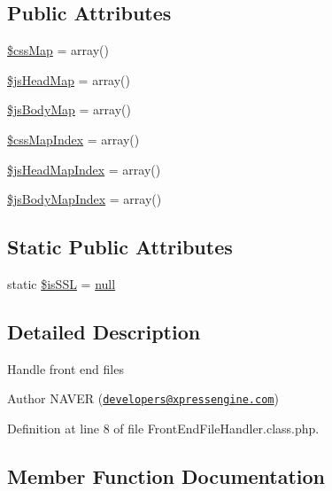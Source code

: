 \subsection*{Public Attributes}
\begin{DoxyCompactItemize}
\item 
\hyperlink{classFrontEndFileHandler_ae7470e6b48cdd0b76b8bd0fd8e38850c}{\$css\+Map} = array()
\item 
\hyperlink{classFrontEndFileHandler_ab434f9c8c874aaf8186e259dff95d116}{\$js\+Head\+Map} = array()
\item 
\hyperlink{classFrontEndFileHandler_ad03de614a088bc386c393543a3cd9aed}{\$js\+Body\+Map} = array()
\item 
\hyperlink{classFrontEndFileHandler_a61df1d725cd1884fd0a260dec738a4b7}{\$css\+Map\+Index} = array()
\item 
\hyperlink{classFrontEndFileHandler_a151a55b31ffaec411a86b7f618eed4ac}{\$js\+Head\+Map\+Index} = array()
\item 
\hyperlink{classFrontEndFileHandler_aba61415d3f993f1f6b9cddc0024f50b1}{\$js\+Body\+Map\+Index} = array()
\end{DoxyCompactItemize}
\subsection*{Static Public Attributes}
\begin{DoxyCompactItemize}
\item 
static \hyperlink{classFrontEndFileHandler_a1e709934ab4023d10850268064d771bc}{\$is\+S\+SL} = \hyperlink{modernizr_8min_8js_a286f9ec831c5e676eeb493248eab9575}{null}
\end{DoxyCompactItemize}


\subsection{Detailed Description}
Handle front end files \begin{DoxyAuthor}{Author}
N\+A\+V\+ER (\href{mailto:developers@xpressengine.com}{\tt developers@xpressengine.\+com}) 
\end{DoxyAuthor}


Definition at line 8 of file Front\+End\+File\+Handler.\+class.\+php.



\subsection{Member Function Documentation}
